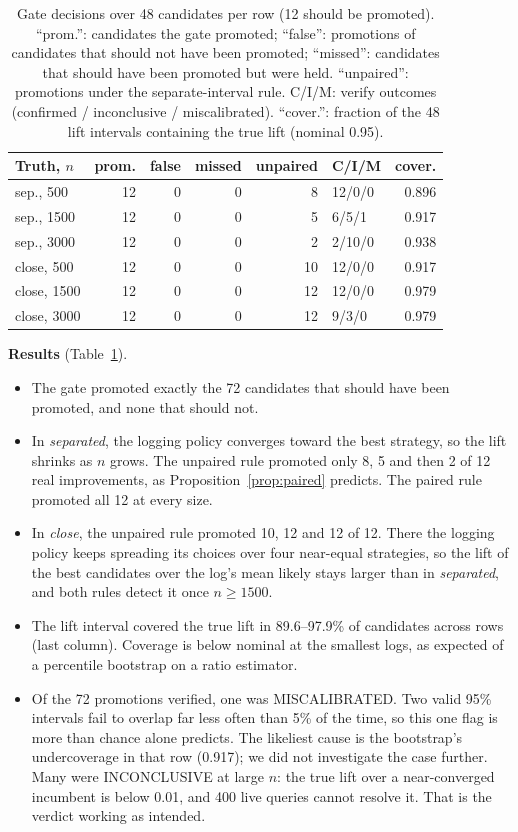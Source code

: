 \documentclass[conference]{IEEEtran}
\begin{document}
\begin{table}[t]
\centering
\caption{Gate decisions over 48 candidates per row (12 should be promoted). ``prom.'': candidates the gate promoted; ``false'': promotions of candidates that should not have been promoted; ``missed'': candidates that should have been promoted but were held. ``unpaired'': promotions under the separate-interval rule. C/I/M: verify outcomes (confirmed / inconclusive / miscalibrated). ``cover.'': fraction of the 48 lift intervals containing the true lift (nominal 0.95).}
\label{tab:gate}
\setlength{\tabcolsep}{4pt}
\begin{tabular}{lrrrrlr}
\toprule
Truth, $n$ & prom. & false & missed & unpaired & C/I/M & cover.\\
\midrule
sep., 500 & 12 & 0 & 0 & 8 & 12/0/0 & 0.896\\
sep., 1500 & 12 & 0 & 0 & 5 & 6/5/1 & 0.917\\
sep., 3000 & 12 & 0 & 0 & 2 & 2/10/0 & 0.938\\
close, 500 & 12 & 0 & 0 & 10 & 12/0/0 & 0.917\\
close, 1500 & 12 & 0 & 0 & 12 & 12/0/0 & 0.979\\
close, 3000 & 12 & 0 & 0 & 12 & 9/3/0 & 0.979\\
\bottomrule
\end{tabular}
\end{table}

\textbf{Results} (Table~\ref{tab:gate}).
\begin{itemize}
\item The gate promoted exactly the 72 candidates that should have been promoted, and none that should not.
\item In \emph{separated}, the logging policy converges toward the best strategy, so the lift shrinks as $n$ grows. The unpaired rule promoted only 8, 5 and then 2 of 12 real improvements, as Proposition~\ref{prop:paired} predicts. The paired rule promoted all 12 at every size.
\item In \emph{close}, the unpaired rule promoted 10, 12 and 12 of 12. There the logging policy keeps spreading its choices over four near-equal strategies, so the lift of the best candidates over the log's mean likely stays larger than in \emph{separated}, and both rules detect it once $n\ge1500$.
\item The lift interval covered the true lift in 89.6--97.9\% of candidates across rows (last column). Coverage is below nominal at the smallest logs, as expected of a percentile bootstrap on a ratio estimator.
\item Of the 72 promotions verified, one was MISCALIBRATED. Two valid 95\% intervals fail to overlap far less often than 5\% of the time, so this one flag is more than chance alone predicts. The likeliest cause is the bootstrap's undercoverage in that row (0.917); we did not investigate the case further. Many were INCONCLUSIVE at large $n$: the true lift over a near-converged incumbent is below 0.01, and 400 live queries cannot resolve it. That is the verdict working as intended.
\end{itemize}
\end{document}
